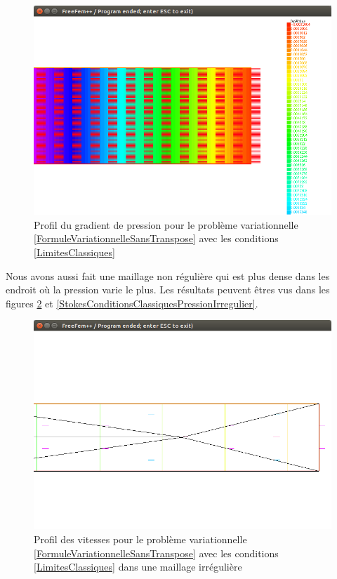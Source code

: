 \documentclass[11pt,a4paper]{article}
\numberwithin{equation}{subsection}
\numberwithin{figure}{subsection}
\begin{document}
\begin{figure}[H]
\centering
\includegraphics[scale=0.4]{StokesConditionsClassiquesPression.png}
\caption{Profil du gradient de pression pour le problème variationnelle \ref{FormuleVariationnelleSansTranspose} avec les conditions \ref{LimitesClassiques}}
\label{StokesCondtiionsClassiquesPression}
\end{figure}

Nous avons aussi fait une maillage non régulière qui est plus dense dans les endroit où la pression varie le plus. Les résultats peuvent êtres vus dans les figures \ref{StokesConditionsClassiquesVitessesIrregulier} et \ref{StokesConditionsClassiquesPressionIrregulier}.

\begin{figure}
\centering
\includegraphics[scale=0.4]{StokesConditionsClassiquesVitessesIrregulier.png}
\caption{Profil des vitesses pour le problème variationnelle \ref{FormuleVariationnelleSansTranspose} avec les conditions \ref{LimitesClassiques} dans une maillage irrégulière}
\label{StokesConditionsClassiquesVitessesIrregulier}
\end{figure}	
\end{document}
